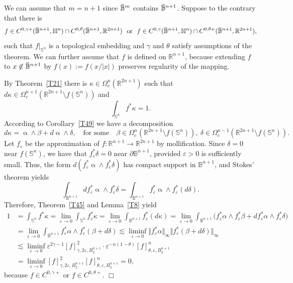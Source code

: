 \documentclass[intlimits,12pt,reqno]{amsart}
\newcommand{\Sph}{\mathbb S}
\newcommand{\bbbb}{\mathbb B}
\newcommand{\bbbh}{\mathbb H}
\newcommand{\R}{\mathbb R}
\newcommand{\overbar}[1]{\mkern 1.7mu\overline{\mkern-1.7mu#1\mkern-1.5mu}\mkern 1.5mu}
\newcommand{\eps}{\varepsilon}
\numberwithin{equation}{section}
\theoremstyle{definition}
\begin{document}
We can assume that $m=n+1$ since $\overbar{\bbbb}^m$ contains $\overbar{\bbbb}^{n+1}$. Suppose to the contrary that there is
$$
f\in C^{0,\gamma+}(\overbar{\bbbb}^{n+1},\bbbh^n)\cap
C^{0,\theta}(\overbar{\bbbb}^{n+1},\R^{2n+1})
\ \
\text{or}
\ \
f\in C^{0,\gamma}(\overbar{\bbbb}^{n+1},\bbbh^n)\cap
C^{0,\theta+}(\overbar{\bbbb}^{n+1},\R^{2n+1}),
$$
such that $f|_{\Sph^{n}}$ is a topological embedding and $\gamma$ and $\theta$ satisfy assumptions of the theorem. We can further assume that $f$ is defined on $\R^{n+1}$, because extending $f$ to  $x\not\in\overbar{\bbbb}^{n+1}$ by $f(x):=f(x/|x|)$ preserves regularity of the mapping.

By Theorem~\ref{T21} there is 
$\kappa\in \Omega_c^n(\R^{2n+1})$ such that 
$d\kappa\in\Omega^{n+1}_c(\R^{2n+1}\setminus f(\Sph^n))$ and
$$
\int_{\Sph^n} f^*\kappa =1.
$$
According to Corollary~\ref{T49} we have a decomposition
$$
d\kappa=\upalpha\wedge\beta+d\upalpha\wedge\delta,
\quad
\text{for some}
\quad
\beta\in \Omega^n_c\left(\R^{2n+1}\setminus f(\Sph^n)\right),\
\delta\in \Omega^{n-1}_c\left(\R^{2n+1}\setminus f(\Sph^n)\right).
$$
Let $f_\eps$ be the approximation of $f:\R^{n+1}\to\R^{2n+1}$ by mollification. 
Since $\delta=0$ near $f(\Sph^n)$, we have that $f^*_\eps\delta=0$ near $\partial\bbbb^{n+1}$, provided $\eps>0$ is sufficiently small. Thus, the form $d(f^*_\eps\upalpha\wedge f_\eps^*\delta)$ has compact support in $\bbbb^{n+1}$, and Stokes' theorem yields
$$
\int_{\bbbb^{n+1}}df_\eps^*\upalpha\wedge f_\eps^*\delta=
\int_{\bbbb^{n+1}} f_\eps^*\upalpha\wedge f_\eps^*(d\delta). 
$$
Therefore, Theorem~\ref{T45} and Lemma~\ref{T8} yield
\begin{align*}
1
&=
\int_{\Sph^n} f^*\kappa = 
\lim_{\eps\to 0} \int_{\Sph^n} f_\eps^*\kappa =
\lim_{\eps\to 0} \int_{\bbbb^{n+1}} f_\eps^*(d\kappa)=
\lim_{\eps\to 0} \int_{\bbbb^{n+1}}
\big(f^*_\eps\alpha\wedge f_\eps^*\beta+df_\eps^*\alpha\wedge f_\eps^*\delta\big)\\
&=
\lim_{\eps\to 0}\int_{\bbbb^{n+1}} f_\eps^*\alpha\wedge f_\eps^*(\beta+d\delta)
\lesssim 
\liminf_{\eps\to 0} 
\Vert f_\eps^*\alpha\Vert_\infty \Vert f_\eps^*(\beta+d\delta)\Vert_\infty\\
&\lesssim
\liminf_{\eps\to 0} \eps^{2\gamma-1}[f]^2_{\gamma,2\eps,B_2^{n+1}}\cdot\eps^{-n(1-\theta)}[f]_{\theta,\eps,B_2^{n+1}}^n\\
&=
\liminf_{\eps\to 0}[f]^2_{\gamma,2\eps,B_2^{n+1}}[f]_{\theta,\eps,B_2^{n+1}}^n
=0,
\end{align*}
because $f\in C^{0,\gamma+}$ or $f\in C^{0,\theta+}$.
\hfill $\Box$
\end{document}
